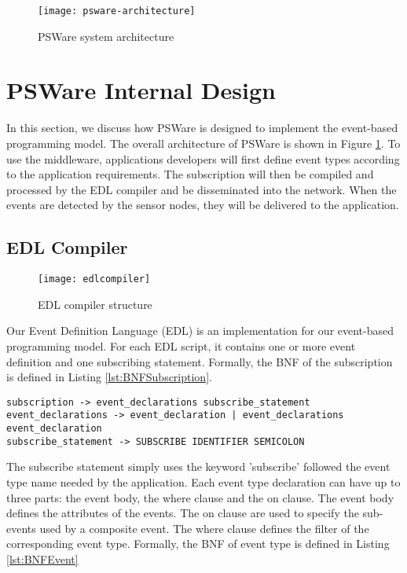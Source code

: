 \begin{figure}
\centering
\texttt{[image: psware-architecture]}
\caption{PSWare system architecture}
\label{fig:psware-architecture}
\end{figure}

\section{PSWare Internal Design}
\label{sec:design}
In this section, we discuss how PSWare is designed to implement the event-based programming model. The overall architecture of PSWare is shown in Figure \ref{fig:psware-architecture}. To use the middleware, applications developers will first define event types according to the application requirements. The subscription will then be compiled and processed by the EDL compiler and be disseminated into the network. When the events are detected by the sensor nodes, they will be delivered to the application.

\subsection{EDL Compiler}
\begin{figure}
\centering
\texttt{[image: edlcompiler]}
\caption{EDL compiler structure}
\label{fig:edlcompiler}
\end{figure}

Our Event Definition Language (EDL) is an implementation for our event-based programming model. For each EDL script, it contains one or more event definition and one subscribing statement. Formally, the BNF of the subscription is defined in Listing \ref{lst:BNFSubscription}.

\begin{lstlisting}[caption=BNF (simplified) of subscription, label=lst:BNFSubscription]
subscription -> event_declarations subscribe_statement
event_declarations -> event_declaration | event_declarations event_declaration
subscribe_statement -> SUBSCRIBE IDENTIFIER SEMICOLON
\end{lstlisting}

The subscribe statement simply uses the keyword 'subscribe' followed the event type name needed by the application. Each event type declaration can have up to three parts: the event body, the where clause and the on clause. The event body defines the attributes of the events. The on clause are used to specify the sub-events used by a composite event. The where clause defines the filter of the corresponding event type. Formally, the BNF of event type is defined in Listing \ref{lst:BNFEvent}

